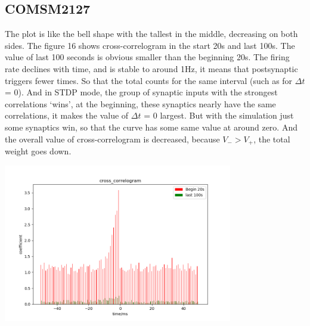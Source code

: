 \documentclass[fleqn,11pt]{article}
\begin{document}
\subsection*{COMSM2127}
The plot is like the bell shape with the tallest in the middle, decreasing on both sides.
The figure 16 shows cross-correlogram in the start 20s and last 100s. The value of last 100 seconds is obvious smaller than the beginning 20s.
The firing rate declines with time, and is stable to around 1Hz, it means that postsynaptic  triggers fewer times. So that the total counts for the same interval 
(such as for $\Delta t$ = 0). And in STDP mode, the group of synaptic inputs with the strongest correlations ‘wins’, at the beginning, these synaptics nearly have the same
correlations, it makes the value of $\Delta t$ = 0 largest. But with the simulation just some synaptics win, so that the curve has some same value at around zero.
And the overall value of cross-correlogram is decreased, because $V_{-} > V_{+}$, the total weight goes down.

\begin{center} 
  \includegraphics[width=10cm]{graphs/ParB_Cmos4.png}
\end{center}
\end{document}

